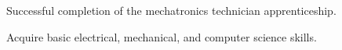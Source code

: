 \begin{tightemize}
    \item Successful completion of the mechatronics technician apprenticeship.
    \item Acquire basic electrical, mechanical, and computer science skills.
\end{tightemize}